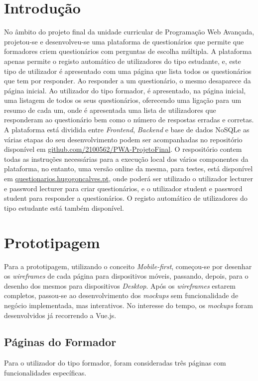 \documentclass[12pt,a4paper,final]{article}
\begin{document}
    \section{Introdução}\label{sec:introducao}
    No âmbito do projeto final da unidade curricular de Programação Web Avançada, projetou-se e desenvolveu-se uma plataforma de questionários que permite que formadores criem questionários com perguntas de escolha múltipla.
    A plataforma apenas permite o registo automático de utilizadores do tipo estudante, e, este tipo de utilizador é apresentado com uma página que lista todos os questionários que tem por responder.
    Ao responder a um questionário, o mesmo desaparece da página inicial.
    Ao utilizador do tipo formador, é apresentado, na página inicial, uma listagem de todos os seus questionários, oferecendo uma ligação para um resumo de cada um, onde é apresentada uma lista de utilizadores que responderam ao questionário bem como o número de respostas erradas e corretas.
    A plataforma está dividida entre \textit{Frontend}, \textit{Backend} e base de dados NoSQL\@ e as várias etapas do seu desenvolvimento podem ser acompanhadas no repositório disponível em \href{https://github.com/2100562/PWA-ProjetoFinal}{github.com/2100562/PWA-ProjetoFinal}.
    O respositório contem todas as instruções necessárias para a execução local dos vários componentes da plataforma, no entanto, uma versão online da mesma, para testes, está disponível em \href{https://questionarios.hugogoncalves.pt}{questionarios.hugogoncalves.pt}, onde poderá ser utilizado o utilizador lecturer e password lecturer para criar questionários, e o utilizador student e password student para responder a questionários.
    O registo automático de utilizadores do tipo estudante está também disponível.


    \section{Prototipagem}\label{sec:prototipagem}
    Para a prototipagem, utilizando o conceito \textit{Mobile-first}, começou-se por desenhar os \textit{wireframes} de cada página para dispositivos móveis, passando, depois, para o desenho dos mesmos para dispositivos \textit{Desktop}.
    Após os \textit{wireframes} estarem completos, passou-se ao desenvolvimento dos \textit{mockups} sem funcionalidade de negócio implementada, mas interativos.
    No interesse do tempo, os \textit{mockups} foram desenvolvidos já recorrendo a Vue.js.

    \subsection{Páginas do Formador}\label{subsec:paginas-do-formador}
    Para o utilizador do tipo formador, foram consideradas três páginas com funcionalidades específicas.
\end{document}
